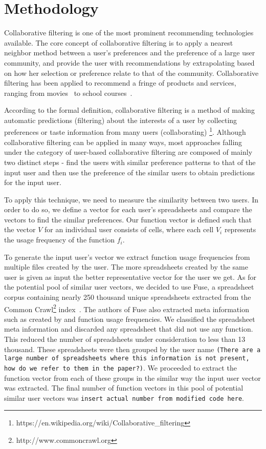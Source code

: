 \documentclass[conference]{IEEEtran}
\begin{document}
\section{Methodology}

Collaborative filtering is one of the most prominent recommending technologies available. The core concept of collaborative filtering is to apply a nearest neighbor method between a user's preferences and the preference of a large user community, and provide the user with recommendations by extrapolating based on how her selection or preference relate to that of the community. Collaborative filtering has been applied to recommend a fringe of products and services, ranging from movies~\cite{miller2003movielens} to school courses~\cite{hsu2008personalized,farzan2006social}. 

According to the formal definition, collaborative filtering is a method of making automatic predictions (filtering) about the interests of a user by collecting preferences or taste information from many users (collaborating) \footnote{https://en.wikipedia.org/wiki/Collaborative\_filtering}. Although collaborative filtering can be applied in many ways, most approaches falling under the category of user-based collaborative filtering are composed of mainly two distinct steps - find the users with similar preference patterns to that of the input user and then use the preference of the similar users to obtain predictions for the input user.

To apply this technique, we need to measure the similarity between two users. In order to do so, we define a vector for each user's spreadsheets and compare the vectors to find the similar preferences. Our function vector is defined such that the vector $V$ for an individual user consists of cells, where each cell $V_i$ represents the usage frequency of the function $f_i$.

To generate the input user's vector we extract function usage frequencies from multiple files created by the user. The more spreadsheets created by the same user is given as input the better representative vector for the user we get. As for the potential pool of similar user vectors, we decided to use Fuse, a spreadsheet corpus containing nearly 250 thousand unique spreadsheets extracted from the Common Crawl\footnote{http://www.commoncrawl.org} index~\cite{barik2015fuse}. The authors of Fuse also extracted meta information such as created by and function usage frequencies. We classified the spreadsheet meta information and discarded any spreadsheet that did not use any function. This reduced the number of spreadsheets under consideration to less than 13 thousand. These spreadsheets were then grouped by the user name \texttt{(There are a large number of spreadsheets where this information is not present, how do we refer to them in the paper?)}. We proceeded to extract the function vector from each of these groups in the similar way the input user vector was extracted. The final number of function vectors in this pool of potential similar user vectors was \texttt{insert actual number from modified code here}.
\end{document}
